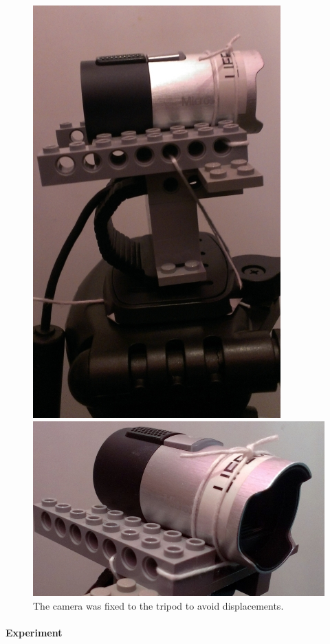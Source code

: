 \documentclass{scrartcl}
\begin{document}
\begin{figure}[H]
\centering
\begin{minipage}{.5\textwidth}
  \centering
  \includegraphics[width=.47\linewidth]{img/fixation_1.jpg}
\end{minipage}%
\begin{minipage}{.5\textwidth}
  \centering
  \includegraphics[width=1.3\linewidth]{img/fixation_2.jpg}
\end{minipage}
\caption{The camera was fixed to the tripod to avoid displacements.}
\label{fig:fixation}
\end{figure}




\paragraph{Experiment}
\end{document}
